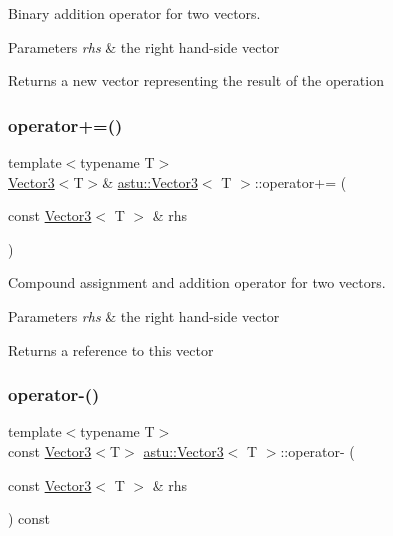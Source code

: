 Binary addition operator for two vectors.


\begin{DoxyParams}{Parameters}
{\em rhs} & the right hand-\/side vector \\
\hline
\end{DoxyParams}
\begin{DoxyReturn}{Returns}
a new vector representing the result of the operation 
\end{DoxyReturn}
\mbox{\label{classastu_1_1Vector3_a613ae7519aebcd1b976b0a9fdf11a9d1}} 
\subsubsection{\texorpdfstring{operator+=()}{operator+=()}}
{\footnotesize\ttfamily template$<$typename T$>$ \\
\hyperlink{classastu_1_1Vector3}{Vector3}$<$T$>$\& \hyperlink{classastu_1_1Vector3}{astu\+::\+Vector3}$<$ T $>$\+::operator+= (\begin{DoxyParamCaption}\item[{const \hyperlink{classastu_1_1Vector3}{Vector3}$<$ T $>$ \&}]{rhs }\end{DoxyParamCaption})\hspace{0.3cm}{\ttfamily [inline]}}

Compound assignment and addition operator for two vectors.


\begin{DoxyParams}{Parameters}
{\em rhs} & the right hand-\/side vector \\
\hline
\end{DoxyParams}
\begin{DoxyReturn}{Returns}
a reference to this vector 
\end{DoxyReturn}
\mbox{\label{classastu_1_1Vector3_ac5e9185fcbde32a799d4cf7d7a147477}} 
\subsubsection{\texorpdfstring{operator-\/()}{operator-()}\hspace{0.1cm}{\footnotesize\ttfamily [1/2]}}
{\footnotesize\ttfamily template$<$typename T$>$ \\
const \hyperlink{classastu_1_1Vector3}{Vector3}$<$T$>$ \hyperlink{classastu_1_1Vector3}{astu\+::\+Vector3}$<$ T $>$\+::operator-\/ (\begin{DoxyParamCaption}\item[{const \hyperlink{classastu_1_1Vector3}{Vector3}$<$ T $>$ \&}]{rhs }\end{DoxyParamCaption}) const\hspace{0.3cm}{\ttfamily [inline]}}

